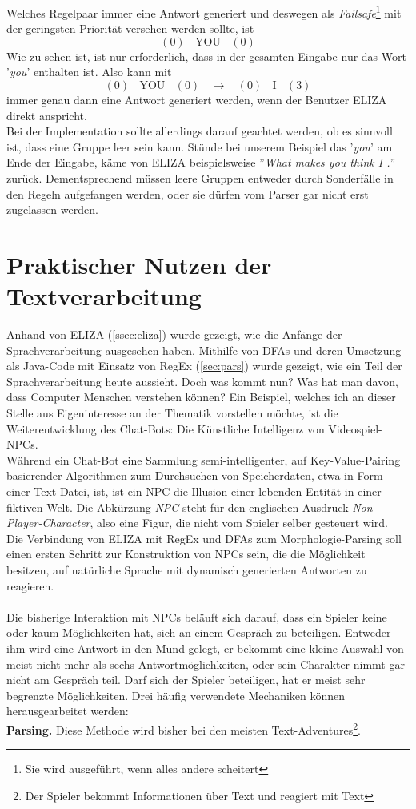 \documentclass[12pt,twoside]{article}
\theoremstyle{plain}
\theoremstyle{definition}
\theoremstyle{remark}
\begin{document}
Welches Regelpaar immer eine Antwort generiert und deswegen als \textit{Failsafe}\footnote{Sie wird ausgeführt, wenn alles andere scheitert} mit der geringsten Priorität versehen werden sollte, ist
\[
	(0)~~~~\text{YOU}~~~~(0)
\]
Wie zu sehen ist, ist nur erforderlich, dass in der gesamten Eingabe nur das Wort '\textit{you}' enthalten ist.
Also kann mit
\[
	(0)~~~~\text{YOU}~~~~(0)~~~~\longrightarrow~~~~(0)~~~~\text{I}~~~~(3)
\]
immer genau dann eine Antwort generiert werden, wenn der Benutzer ELIZA direkt anspricht.\\
Bei der Implementation sollte allerdings darauf geachtet werden, ob es sinnvoll ist, dass eine Gruppe leer sein kann.
Stünde bei unserem Beispiel das '\textit{you}' am Ende der Eingabe, käme von ELIZA beispielsweise ''\textit{What makes you think I .}'' zurück.
Dementsprechend müssen leere Gruppen entweder durch Sonderfälle in den Regeln aufgefangen werden, oder sie dürfen vom Parser gar nicht erst zugelassen werden.
\section{Praktischer Nutzen der Textverarbeitung}
\label{sec:ausb}
Anhand von ELIZA (\ref{ssec:eliza}) wurde gezeigt, wie die Anfänge der Sprachverarbeitung ausgesehen haben.
Mithilfe von DFAs und deren Umsetzung als Java-Code mit Einsatz von RegEx (\ref{sec:pars}) wurde gezeigt, wie ein Teil der Sprachverarbeitung heute aussieht.
Doch was kommt nun?
Was hat man davon, dass Computer Menschen verstehen können?
Ein Beispiel, welches ich an dieser Stelle aus Eigeninteresse an der Thematik vorstellen möchte, ist die Weiterentwicklung des Chat-Bots: Die Künstliche Intelligenz von Videospiel-NPCs.\\
Während ein Chat-Bot eine Sammlung semi-intelligenter, auf Key-Value-Pairing basierender Algorithmen zum Durchsuchen von Speicherdaten, etwa in Form einer Text-Datei, ist, ist ein NPC die Illusion einer lebenden Entität in einer fiktiven Welt.
Die Abkürzung \textit{NPC} steht für den englischen Ausdruck \textit{Non-Player-Character}, also eine Figur, die nicht vom Spieler selber gesteuert wird.\\
Die Verbindung von ELIZA mit RegEx und DFAs zum Morphologie-Parsing soll einen ersten Schritt zur Konstruktion von NPCs sein, die die Möglichkeit besitzen, auf natürliche Sprache mit dynamisch generierten Antworten zu reagieren.\\
\\
Die bisherige Interaktion mit NPCs beläuft sich darauf, dass ein Spieler keine oder kaum Möglichkeiten hat, sich an einem Gespräch zu beteiligen.
Entweder ihm wird eine Antwort in den Mund gelegt, er bekommt eine kleine Auswahl von meist nicht mehr als sechs Antwortmöglichkeiten, oder sein Charakter nimmt gar nicht am Gespräch teil.
Darf sich der Spieler beteiligen, hat er meist sehr begrenzte Möglichkeiten.
Drei häufig verwendete Mechaniken können herausgearbeitet werden:\\
\textbf{Parsing.}
Diese Methode wird bisher bei den meisten Text-Adventures\footnote{Der Spieler bekommt Informationen über Text und reagiert mit Text}.
\end{document}
